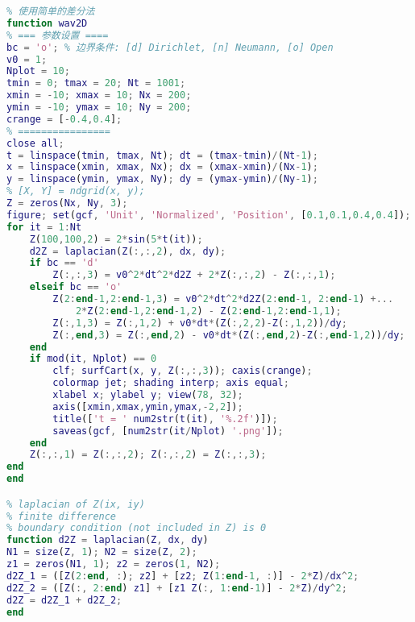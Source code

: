 \begin{lstlisting}[language=matlab, caption=wav2D.m]
% 二维波动方程的简单数值解
% 使用简单的差分法
function wav2D
% === 参数设置 ====
bc = 'o'; % 边界条件: [d] Dirichlet, [n] Neumann, [o] Open
v0 = 1;
Nplot = 10;
tmin = 0; tmax = 20; Nt = 1001;
xmin = -10; xmax = 10; Nx = 200;
ymin = -10; ymax = 10; Ny = 200;
crange = [-0.4,0.4];
% ================
close all;
t = linspace(tmin, tmax, Nt); dt = (tmax-tmin)/(Nt-1);
x = linspace(xmin, xmax, Nx); dx = (xmax-xmin)/(Nx-1);
y = linspace(ymin, ymax, Ny); dy = (ymax-ymin)/(Ny-1);
% [X, Y] = ndgrid(x, y);
Z = zeros(Nx, Ny, 3);
figure; set(gcf, 'Unit', 'Normalized', 'Position', [0.1,0.1,0.4,0.4]);
for it = 1:Nt
    Z(100,100,2) = 2*sin(5*t(it));
    d2Z = laplacian(Z(:,:,2), dx, dy);
    if bc == 'd'
        Z(:,:,3) = v0^2*dt^2*d2Z + 2*Z(:,:,2) - Z(:,:,1);
    elseif bc == 'o'
        Z(2:end-1,2:end-1,3) = v0^2*dt^2*d2Z(2:end-1, 2:end-1) +...
            2*Z(2:end-1,2:end-1,2) - Z(2:end-1,2:end-1,1);
        Z(:,1,3) = Z(:,1,2) + v0*dt*(Z(:,2,2)-Z(:,1,2))/dy;
        Z(:,end,3) = Z(:,end,2) - v0*dt*(Z(:,end,2)-Z(:,end-1,2))/dy;
    end
    if mod(it, Nplot) == 0
        clf; surfCart(x, y, Z(:,:,3)); caxis(crange);
        colormap jet; shading interp; axis equal;
        xlabel x; ylabel y; view(78, 32);
        axis([xmin,xmax,ymin,ymax,-2,2]);
        title(['t = ' num2str(t(it), '%.2f')]);
        saveas(gcf, [num2str(it/Nplot) '.png']);
    end
    Z(:,:,1) = Z(:,:,2); Z(:,:,2) = Z(:,:,3);
end
end

% laplacian of Z(ix, iy)
% finite difference
% boundary condition (not included in Z) is 0
function d2Z = laplacian(Z, dx, dy)
N1 = size(Z, 1); N2 = size(Z, 2);
z1 = zeros(N1, 1); z2 = zeros(1, N2);
d2Z_1 = ([Z(2:end, :); z2] + [z2; Z(1:end-1, :)] - 2*Z)/dx^2;
d2Z_2 = ([Z(:, 2:end) z1] + [z1 Z(:, 1:end-1)] - 2*Z)/dy^2;
d2Z = d2Z_1 + d2Z_2;
end
\end{lstlisting}
